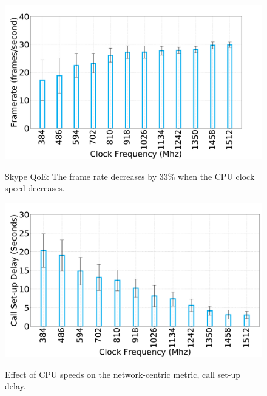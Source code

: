 
\begin{figure}
\begin{minipage}[t]{0.5\linewidth}
   \includegraphics[width=\linewidth]{sections/device-work/skype-fps.pdf}
   \caption{Skype QoE: The frame rate decreases by 33\% when the CPU clock speed decreases.} 
   \vspace{-0.2in}
   \label{fig:skype-framerate}
\end{minipage}
\hspace{0.1in}
\begin{minipage}[t]{0.5\linewidth}
   \includegraphics[width=\linewidth]{sections/device-work/skype-call-setup.pdf}
   \caption{Effect of CPU speeds on the network-centric metric, call set-up delay.} 
   \vspace{-0.2in}
   \label{fig:skype-call}
\end{minipage}


\end{figure}
